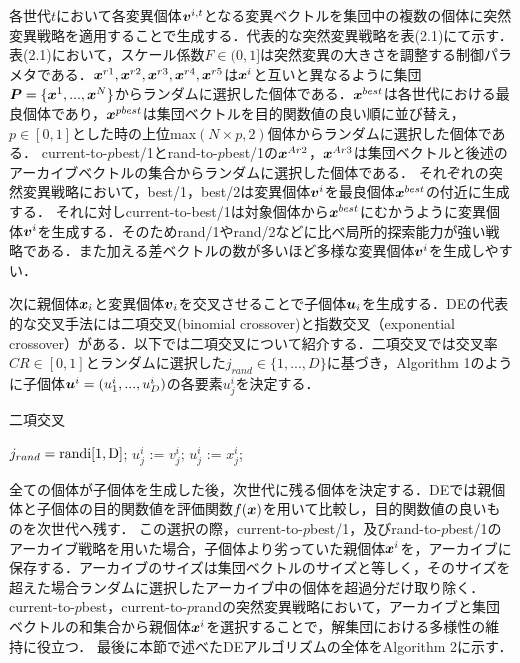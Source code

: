 \documentclass[a4paper,11pt,oneside,openany]{jsbook}
\def\vector#1{\mbox{\boldmath $#1$}}
\begin{document}
各世代$t$において各変異個体${\vector{v}^{i,t}}$となる変異ベクトルを集団中の複数の個体に突然変異戦略を適用することで生成する．代表的な突然変異戦略を表(2.1)にて示す．表(2.1)において，スケール係数${F\in(0,1]}$は突然変異の大きさを調整する制御パラメタである．$\vector{x}^{r1},\vector{x}^{r2},\vector{x}^{r3},\vector{x}^{r4},\vector{x}^{r5}$は${\vector{x}^i}$と互いと異なるように集団$\vector{P} = \{ \vector{x}^1, ..., \vector{x}^N \}$からランダムに選択した個体である．$\vector{x}^{best}$は各世代における最良個体であり，$\vector{x}^{pbest}$は集団ベクトルを目的関数値の良い順に並び替え，${p\in[0,1]}とした時の上位$max$(N \times p, 2)$個体からランダムに選択した個体である．
current-to-$p$best/1とrand-to-$p$best/1の${\vector{x}^{Ar2}}$，${\vector{x}^{Ar3}}$は集団ベクトルと後述のアーカイブベクトルの集合からランダムに選択した個体である．
それぞれの突然変異戦略において，best/1，best/2は変異個体{$\vector{v}^i$}を最良個体$\vector{x}^{best}$の付近に生成する．
それに対しcurrent-to-best/1は対象個体から$\vector{x}^{best}$にむかうように変異個体{$\vector{v}^i$}を生成する．そのためrand/1やrand/2などに比べ局所的探索能力が強い戦略である．また加える差ベクトルの数が多いほど多様な変異個体{$\vector{v}^i$}を生成しやすい．

次に親個体$\vector{x}_i$と変異個体$\vector{v}_i$を交叉させることで子個体$\vector{u}_i$を生成する．DEの代表的な交叉手法には二項交叉(binomial crossover)と指数交叉（exponential crossover）がある．以下では二項交叉について紹介する．二項交叉では交叉率$CR \in [0,1]$とランダムに選択した$j_{rand} \in \{1,...,D\}$に基づき，Algorithm 1のように子個体$\vector{u}^i = (u^i_1,...,u^i_D)$の各要素$u^i_j$を決定する．


\begin{algorithm}
\caption{二項交叉}
\label{alg:pbnf}
\begin{algorithmic}
\STATE $j_{rand} = \rm{randi}[1, D]$;
  \IF {$\rm{rand}[0,1) \leqq $ \OR $j == j_{rand} $}
    \STATE $u^i_j$ := $v^i_j$;
  \ELSE
    \STATE $u^i_j$ := $x^i_j$;
  \ENDIF
\ENDFOR
\end{algorithmic}
\end{algorithm}


全ての個体が子個体を生成した後，次世代に残る個体を決定する．DEでは親個体と子個体の目的関数値を評価関数$f(\vector{x})$を用いて比較し，目的関数値の良いものを次世代へ残す．
この選択の際，current-to-$p$best/1，及びrand-to-$p$best/1のアーカイブ戦略を用いた場合，子個体より劣っていた親個体$\vector{x}^i$を，アーカイブに保存する．アーカイブのサイズは集団ベクトルのサイズと等しく，そのサイズを超えた場合ランダムに選択したアーカイブ中の個体を超過分だけ取り除く．current-to-$p$best，current-to-$p$randの突然変異戦略において，アーカイブと集団ベクトルの和集合から親個体$\vector{x}^i$を選択することで，解集団における多様性の維持に役立つ．
最後に本節で述べたDEアルゴリズムの全体をAlgorithm 2に示す．
\end{document}
